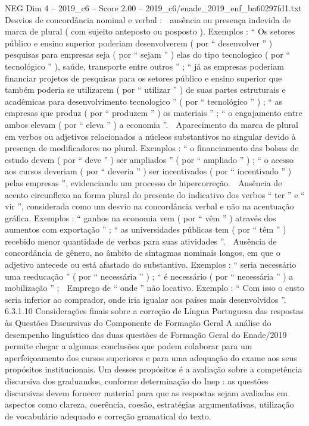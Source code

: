 \begin{textsample}{NEG Dim 4 – 2019\_c6 – Score 2.00 – 2019\_c6/enade\_2019\_enf\_ba60297fd1.txt}
Desvios de concordância nominal e verbal :  ausência ou presença indevida de marca de plural ( com sujeito anteposto ou posposto ).
Exemplos : “ Os setores público e ensino superior poderiam desenvolverem ( por “ desenvolver ” ) pesquisas para empresas seja ( por “ sejam ” ) elas do tipo tecnologico ( por “ tecnológico ” ), saúde, transporte entre outros ” ; “ já as empresas poderiam financiar projetos de pesquisas para os setores público e ensino superior que também poderia se utilizarem ( por “ utilizar ” ) de suas partes estruturais e acadêmicas para desenvolvimento tecnologico ” ( por “ tecnológico ” ) ; “ as empresas que produz ( por “ produzem ” ) os materiais ” ; “ o engajamento entre ambos elevam ( por “ eleva ” ) a economia ”.  Aparecimento da marca de plural em verbos ou adjetivos relacionados a núcleos substantivos no singular devido à presença de modificadores no plural.
Exemplos : “ o financiamento das bolsas de estudo devem ( por “ deve ” ) ser ampliados ” ( por “ ampliado ” ) ; “ o acesso aos cursos deveriam ( por “ deveria ” ) ser incentivados ( por “ incentivado ” ) pelas empresas ”, evidenciando um processo de hipercorreção.  Ausência de acento circunflexo na forma plural do presente do indicativo dos verbos “ ter ” e “ vir ”, considerada como um desvio na concordância verbal e não na acentuação gráfica.
Exemplos : “ ganhos na economia vem ( por “ vêm ” ) através dos aumentos com exportação ” ; “ as universidades públicas tem ( por “ têm ” ) recebido menor quantidade de verbas para suas atividades ”.  Ausência de concordância de gênero, no âmbito de sintagmas nominais longos, em que o adjetivo antecede ou está afastado do substantivo.
Exemplos : “ seria necessário uma reeducação ” ( por “ necessária ” ) ; “ é necessário ( por “ necessária ” ) a mobilização ” ;  Emprego de “ onde ” não locativo.
Exemplo : “ Com isso o custo seria inferior ao comprador, onde iria igualar aos países mais desenvolvidos ”. 6.3.1.10 Considerações finais sobre a correção de Língua Portuguesa das respostas às Questões Discursivas do Componente de Formação Geral A análise do desempenho linguístico das duas questões de Formação Geral do Enade/2019 permite chegar a algumas conclusões que podem colaborar para um aperfeiçoamento dos cursos superiores e para uma adequação do exame aos seus propósitos institucionais.
Um desses propósitos é a avaliação sobre a competência discursiva dos graduandos, conforme determinação do Inep : as questões discursivas devem fornecer material para que as respostas sejam avaliadas em aspectos como clareza, coerência, coesão, estratégias argumentativas, utilização de vocabulário adequado e correção gramatical do texto.

\end{textsample}
